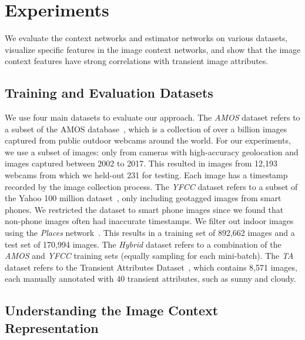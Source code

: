\documentclass{bmvc2k}
\begin{document}
\section{Experiments}

We evaluate the context networks and estimator networks on various
datasets, visualize specific features in the image context networks,
and show that the image context features have strong correlations with
transient image attributes.

\subsection{Training and Evaluation Datasets}

We use four main datasets to evaluate our approach.  The {\em AMOS}
dataset refers to a subset of the AMOS
database~\cite{jacobs07amos}, which is a collection of over a billion
images captured from public outdoor webcams around the world.  For our
experiments, we use a subset of images: only from cameras with
high-accuracy geolocation and images captured between 2002 to 2017.
This resulted in images from 12,193 webcams from which we held-out 231
for testing. Each image has a timestamp recorded by the image
collection process.  The {\em YFCC} dataset refers to a subset of
the Yahoo 100 million dataset~\cite{yfcc100m}, only including
geotagged images from smart phones.  We restricted the dataset to
smart phone images since we found that non-phone images often had
inaccurate timestamps.  We filter out indoor images using the {\em
Places} network~\cite{zhou2017places}. This results in a training set
of 892,662 images and a test set of 170,994 images.  The
{\em Hybrid} dataset refers to a combination of the {\em AMOS} and
{\em YFCC} training sets (equally sampling for each mini-batch).  The
{\em TA} dataset refers to the Transient Attributes
Dataset~\cite{laffont2014transient}, which contains 8,571 images, each
manually annotated with $40$ transient attributes, such as sunny and
cloudy.

\subsection{Understanding the Image Context Representation}
\end{document}
